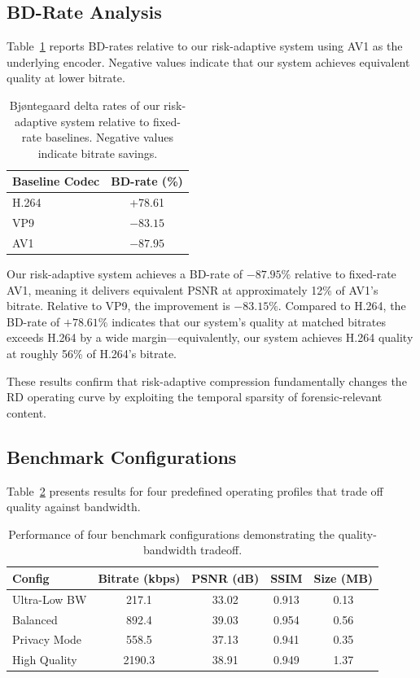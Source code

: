 \subsection{BD-Rate Analysis}

Table~\ref{tab:bd_rates} reports BD-rates relative to our risk-adaptive system using AV1 as the underlying encoder. Negative values indicate that our system achieves equivalent quality at lower bitrate.

\begin{table}[t]
\centering
\caption{Bj{\o}ntegaard delta rates of our risk-adaptive system relative to fixed-rate baselines. Negative values indicate bitrate savings.}
\label{tab:bd_rates}
\begin{tabular}{lc}
\toprule
\textbf{Baseline Codec} & \textbf{BD-rate (\%)} \\
\midrule
H.264  & +78.61 \\
VP9    & $-83.15$ \\
AV1    & $-87.95$ \\
\bottomrule
\end{tabular}
\end{table}

Our risk-adaptive system achieves a BD-rate of $-87.95\%$ relative to fixed-rate AV1, meaning it delivers equivalent PSNR at approximately 12\% of AV1's bitrate. Relative to VP9, the improvement is $-83.15\%$. Compared to H.264, the BD-rate of $+78.61\%$ indicates that our system's quality at matched bitrates exceeds H.264 by a wide margin---equivalently, our system achieves H.264 quality at roughly 56\% of H.264's bitrate.

These results confirm that risk-adaptive compression fundamentally changes the RD operating curve by exploiting the temporal sparsity of forensic-relevant content.

\subsection{Benchmark Configurations}

Table~\ref{tab:benchmark} presents results for four predefined operating profiles that trade off quality against bandwidth.

\begin{table}[t]
\centering
\caption{Performance of four benchmark configurations demonstrating the quality-bandwidth tradeoff.}
\label{tab:benchmark}
\begin{tabular}{lcccc}
\toprule
\textbf{Config} & \textbf{Bitrate (kbps)} & \textbf{PSNR (dB)} & \textbf{SSIM} & \textbf{Size (MB)} \\
\midrule
Ultra-Low BW  & 217.1 & 33.02 & 0.913 & 0.13 \\
Balanced      & 892.4 & 39.03 & 0.954 & 0.56 \\
Privacy Mode  & 558.5 & 37.13 & 0.941 & 0.35 \\
High Quality  & 2190.3 & 38.91 & 0.949 & 1.37 \\
\bottomrule
\end{tabular}
\end{table}

